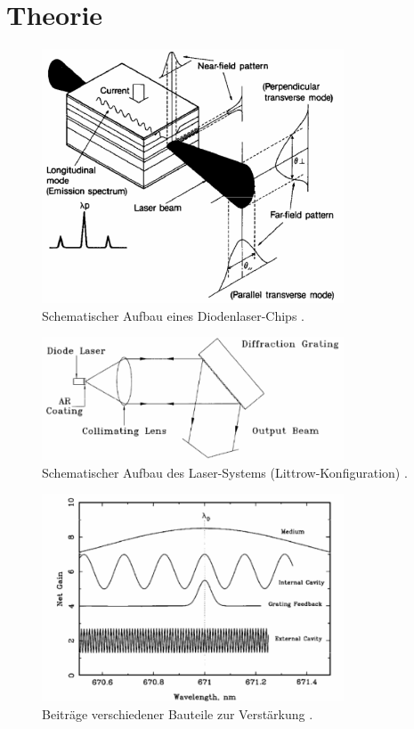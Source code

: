 \section{Theorie}
\label{sec:Theorie}

\begin{figure}
    \centering
    \includegraphics[width=0.8\textwidth]{LaserChip.png}
    \caption{Schematischer Aufbau eines Diodenlaser-Chips \cite{ap60}.}
    \label{fig:LaserChip}
\end{figure}


\begin{figure}
    \centering
    \includegraphics[width=0.8\textwidth]{LittrowSetup.png}
    \caption{Schematischer Aufbau des Laser-Systems (Littrow-Konfiguration) \cite{ap60}.}
    \label{fig:Littrow}
\end{figure}


\begin{figure}
    \centering
    \includegraphics[width=0.8\textwidth]{NetGain.png}
    \caption{Beiträge verschiedener Bauteile zur Verstärkung \cite{ap60}.}
    \label{fig:Gain}
\end{figure}


